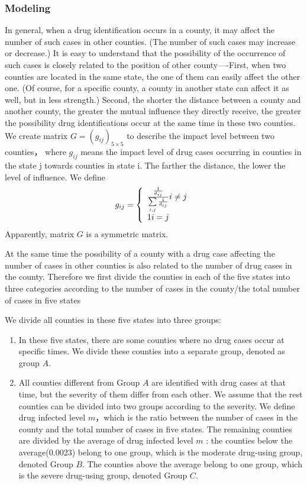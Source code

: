\documentclass{mcmthesis}
\begin{document}
\subsubsection{Modeling}
In general, when a drug identification occurs in a county, it may affect the number of such cases in other counties. (The number of such cases may increase or decrease.) It is easy to understand that the possibility of the occurrence of such cases is closely related to the position of other county----First, when two counties are located in the same state, the one of them can easily affect the other one. (Of course, for a specific county, a county in another state can affect it as well, but in less strength.) Second, the shorter the distance between a county and another county, the greater the mutual influence they directly receive, the greater the possibility drug identifications occur at the same time in these two counties. We create matrix $G = {\left( {{g_{ij}}} \right)_{5 \times 5}}$ to describe the impact level between two counties， where ${g_{ij}}$ means the impact level of drug cases occurring in counties in the state j towards counties in state i. The farther the distance, the lower the level of influence.  We define
 \begin{equation}{g_{ij}} = \left\{ \begin{array}{l}
\frac{{\frac{1}{{{d_{ij}}}}}}{{\sum\limits_{i,j} {\frac{1}{{{d_{ij}}}}} }}{\rm{              }}i \ne j\\
1{\rm{                       }}i = j
\end{array} \right. \end{equation}
Apparently, matrix $G$ is a symmetric matrix.

At the same time the possibility of a county with a drug case affecting the number of cases in other counties is also related to the number of drug cases in the county.  Therefore we first divide the counties in each of the five states into three categories according to the number of cases in the county/the total number of cases in five states

We divide all counties in these five states into three groups:
\begin{enumerate}
  \item 	In these five states, there are some counties where no drug cases occur at specific times. We divide these counties into a separate group, denoted as group $A$.
  \item All counties different from Group $A$ are identified with drug cases at that time, but the severity of them differ from each other. We assume that the rest counties can be divided into two groups according to the severity. We define drug infected level $m$，which is the ratio between the number of cases in the county and the total number of cases in five states. The remaining counties are divided by the average of drug infected level $m$ : the counties below the average(0.0023) belong to one group, which is the moderate drug-using group, denoted Group $B$. The counties above the average belong to one group, which is the severe drug-using group, denoted Group $C$.
\end{enumerate}
\end{document}
